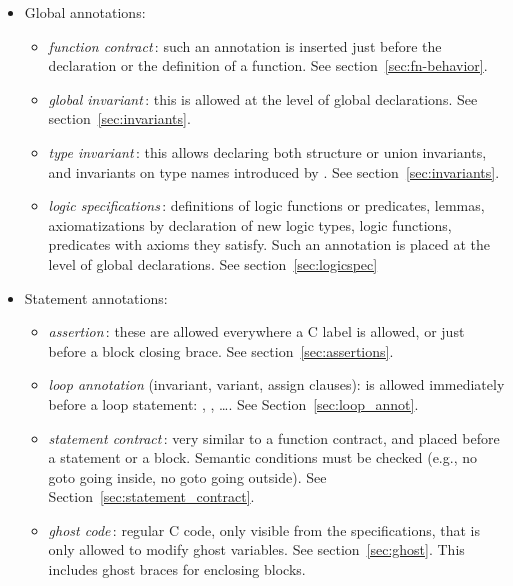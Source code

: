 \begin{itemize}
\item Global annotations:
  \begin{itemize}
  \item \emph{function contract}\,: such an annotation is inserted just before
    the declaration or the definition of a function.
    See section~\ref{sec:fn-behavior}.

  \item \emph{global invariant}\,: this is allowed at the level of
    global declarations. See section~\ref{sec:invariants}.

  \item \emph{type invariant}\,: this allows declaring both structure
    or union invariants, and invariants on type names introduced by
    \typedef.  See section~\ref{sec:invariants}.

  \item \emph{logic specifications}\,: definitions of logic functions
    or predicates, lemmas, axiomatizations by declaration of new logic
    types, logic functions, predicates with axioms they satisfy. Such an
    annotation is placed at the level of global declarations. 
    See section~\ref{sec:logicspec}

  \end{itemize}

\item Statement annotations:
  \begin{itemize}
  \item \emph{assertion}\,: these are allowed
    everywhere a C label is allowed, or just before a
    block closing brace. See section~\ref{sec:assertions}.

  \item \emph{loop annotation} (invariant, variant, assign clauses): is
    allowed immediately before a loop statement: \For, \While,
    \Do\ldots \While. See Section~\ref{sec:loop_annot}.

  \item \emph{statement contract}\,: very similar to a function contract, and
    placed before a statement or a block.  Semantic conditions must
    be checked (e.g., no goto going inside, no goto
    going outside).  See Section~\ref{sec:statement_contract}.

  \item \emph{ghost code}\,: regular C code, only visible from the
    specifications, that is only allowed to modify ghost
    variables. See section~\ref{sec:ghost}. This includes ghost braces
    for enclosing blocks.

  \end{itemize}

\end{itemize}

